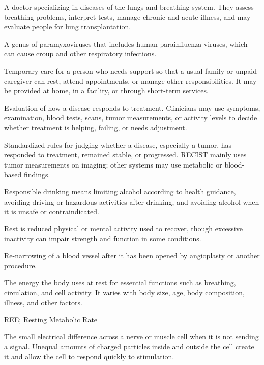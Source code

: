  A doctor specializing in diseases of the lungs and breathing system. They assess breathing problems, interpret tests, manage chronic and acute illness, and may evaluate people for lung transplantation.

 A genus of paramyxoviruses that includes human parainfluenza viruses, which can cause croup and other respiratory infections.

 Temporary care for a person who needs support so that a usual family or unpaid caregiver can rest, attend appointments, or manage other responsibilities. It may be provided at home, in a facility, or through short-term services.

 Evaluation of how a disease responds to treatment. Clinicians may use symptoms, examination, blood tests, scans, tumor measurements, or activity levels to decide whether treatment is helping, failing, or needs adjustment.

 Standardized rules for judging whether a disease, especially a tumor, has responded to treatment, remained stable, or progressed. RECIST mainly uses tumor measurements on imaging; other systems may use metabolic or blood-based findings.

 Responsible drinking means limiting alcohol according to health guidance, avoiding driving or hazardous activities after drinking, and avoiding alcohol when it is unsafe or contraindicated.

 Rest is reduced physical or mental activity used to recover, though excessive inactivity can impair strength and function in some conditions.

 Re-narrowing of a blood vessel after it has been opened by angioplasty or another procedure.

 The energy the body uses at rest for essential functions such as breathing, circulation, and cell activity. It varies with body size, age, body composition, illness, and other factors.

\synonyms
REE; Resting Metabolic Rate

 The small electrical difference across a nerve or muscle cell when it is not sending a signal. Unequal amounts of charged particles inside and outside the cell create it and allow the cell to respond quickly to stimulation.

